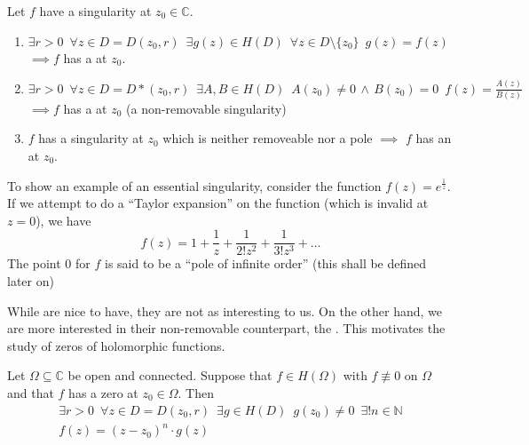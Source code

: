 \documentclass[notoc,notitlepage]{tufte-book}
\begin{document}
\begin{defn}\label{defn:removable_singularity_pole_essential_singularity}
	Let $f$ have a singularity at $z_0 \in \mathbb{C}$.
	\begin{enumerate}
		\item $\exists r > 0 \enspace \forall z \in D = D(z_0, r) \enspace \exists g(z) \in H(D) \enspace \forall z \in D \setminus \{z_0\} \enspace g(z) = f(z)$ \\ $\implies f$ has a  at $z_0$.

		\item $\exists r > 0 \enspace \forall z \in D = D*(z_0, r) \enspace \exists A, B \in H(D) \enspace A(z_0) \neq 0 \, \land \, B(z_0) = 0 \enspace f(z) = \frac{A(z)}{B(z)}$ \\ $\implies f$ has a  at $z_0$ (a non-removable singularity)

		\item $f$ has a singularity at $z_0$ which is neither removeable nor a pole $\implies$ $f$ has an  at $z_0$.
	\end{enumerate}
\end{defn}

\begin{eg}
	To show an example of an essential singularity, consider the function $f(z) = e^{\frac{1}{z}}$. If we attempt to do a ``Taylor expansion'' on the function (which is invalid at $z = 0$), we have
	\begin{equation*}
		f(z) = 1 + \frac{1}{z} + \frac{1}{2! z^2} + \frac{1}{3! z^3} + \hdots
	\end{equation*}
	The point $0$ for $f$ is said to be a ``pole of infinite order'' (this shall be defined later on)
\end{eg}

While  are nice to have, they are not as interesting to us. On the other hand, we are more interested in their non-removable counterpart, the . This motivates the study of zeros of holomorphic functions.

\begin{thm}[Theorem 9]\label{thm:theorem_9}
	Let $\Omega \subseteq \mathbb{C}$ be open and connected. Suppose that $f \in H(\Omega)$ with $f \not\equiv 0$ on $\Omega$ and that $f$ has a zero at $z_0 \in \Omega$. Then
	\begin{gather}
		\exists r > 0 \enspace \forall z \in D = D(z_0, r) \enspace \exists g \in H(D) \enspace g(z_0) \neq 0 \enspace \exists! n \in \mathbb{N} \nonumber \\
		f(z) = (z - z_0)^n \cdot g(z) \label{eq:theorem_9_eq}
	\end{gather}
\end{thm}
\end{document}
